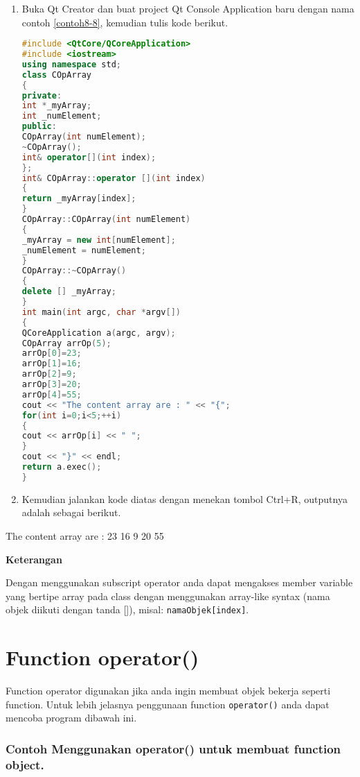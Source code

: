 \begin{enumerate}

\item
  Buka Qt Creator dan buat project Qt Console Application baru dengan
  nama contoh \ref{contoh8-8}, kemudian tulis kode berikut.

\begin{lstlisting}[language=c++, caption=Subscript Operator untuk Dynamic Array, label=contoh8-8]
#include <QtCore/QCoreApplication>
#include <iostream>
using namespace std;
class COpArray
{
private:
int *_myArray;
int _numElement;
public:
COpArray(int numElement);
~COpArray();
int& operator[](int index);
};
int& COpArray::operator [](int index)
{
return _myArray[index];
}
COpArray::COpArray(int numElement)
{
_myArray = new int[numElement];
_numElement = numElement;
}
COpArray::~COpArray()
{
delete [] _myArray;
}
int main(int argc, char *argv[])
{
QCoreApplication a(argc, argv);
COpArray arrOp(5);
arrOp[0]=23;
arrOp[1]=16;
arrOp[2]=9;
arrOp[3]=20;
arrOp[4]=55;
cout << "The content array are : " << "{";
for(int i=0;i<5;++i)
{
cout << arrOp[i] << " ";
}
cout << "}" << endl;
return a.exec();
}
\end{lstlisting}
\item
  Kemudian jalankan kode diatas dengan menekan tombol Ctrl+R, outputnya
  adalah sebagai berikut.
\end{enumerate}

\begin{lcverbatim}
The content array are : {23 16 9 20 55 }
\end{lcverbatim}

\textbf{Keterangan}

Dengan menggunakan subscript operator anda dapat mengakses member
variable yang bertipe array pada class dengan menggunakan array-like
syntax (nama objek diikuti dengan tanda {[}{]}), misal:
\texttt{namaObjek{[}index{]}}.

\section{Function operator()}\label{function-operator}

Function operator digunakan jika anda ingin membuat objek bekerja
seperti function. Untuk lebih jelasnya penggunaan function
\texttt{operator()} anda dapat mencoba program dibawah ini.

\subsubsection*{Contoh  Menggunakan operator() untuk membuat function object.}

